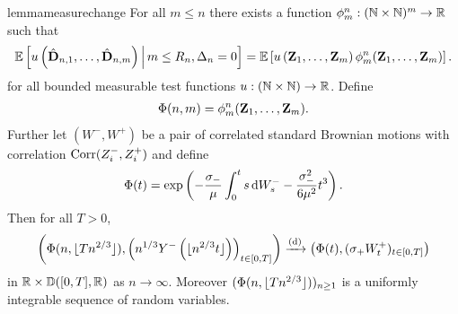 \begin{restatable}{lemma}{measurechange}
    \label{lem:measure-change}
    For all $m \leq n$ there exists a function $\phi^n_m: ({\mathbb N} \times {\mathbb N})^m \to {\mathbb R}$ such that 
    \begin{equation*}
        {\mathbb E}\left[ 
            u\left( 
                \hat{{\mathbf D}}_{n, 1}, \ldots, \hat{{\mathbf D}}_{n, m}
             \right) 
             \,\middle\vert\,
             m \leq R_n, \Delta_n = 0
         \right]
        =
        {\mathbb E}\left[ 
            u\left( 
                {\mathbf Z}_1, \ldots, {\mathbf Z}_m
             \right)
             \phi^n_m({\mathbf Z}_1, \ldots, {\mathbf Z}_m)
         \right].
    \end{equation*}
    for all bounded measurable test functions $u: ({\mathbb N} \times {\mathbb N}) \to {\mathbb R}$. Define
    \begin{align*}
        \Phi(n, m) = \phi^n_m({\mathbf Z}_1, \ldots, {\mathbf Z}_m).
    \end{align*}
    Further let $(W^-, W^+)$ be a pair of correlated standard Brownian motions with correlation $\operatorname{Corr}(Z^-_i, Z^+_i)$ and define
    \begin{equation*}
        \Phi(t) = \exp \left( 
            - \frac{\sigma_-}{\mu} \int_0^t s \mathop{}\!\mathrm{d} W^-_s - \frac{\sigma_-^2}{6 \mu^2} t^3
         \right).
    \end{equation*}
    Then for all $T > 0$,
    \begin{equation*}
        \left( 
            \Phi(n, \lfloor T n^{2/3}\rfloor), \left( n^{1/3} Y^-\left( \lfloor n^{2/3} t\rfloor \right) \right)_{t \in [0, T]}
        \right)
        \xrightarrow[]{\mathrm{(d)}}
        \left( 
            \Phi(t),
            (\sigma_+ W^+_t)_{t \in [0, T]}
        \right)
    \end{equation*}
    in ${\mathbb R} \times {\mathbb D}([0, T], {\mathbb R})$ as $n \to \infty$. Moreover $(\Phi(n, \lfloor T n^{2/3}\rfloor))_{n \geq 1}$ is a uniformly integrable sequence of random variables.
\end{restatable}